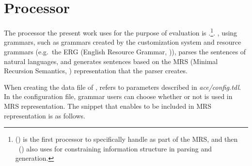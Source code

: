 \section{Processor}
\label{12:sec:processor}

The processor the present work uses for the purpose of evaluation is
\isi{\ace}.\footnote{\isi{\ace} ()
is the first  processor to specifically handle
 as part of the MRS, and then \isi{\agree}~(\citealt{slayden:12}) also uses 
    for constraining information structure in parsing and
  generation.}.
\isi{\ace}, using  grammars, such as \lingo {} grammars created by
the customization system
\citep{bender:flickinger:05,drellishak:09,bender:etal:10} and resource
grammars (e.g.\ the ERG (English Resource Grammar,
\citealt{flickinger:00})), parses the sentences of natural languages,
and generates sentences based on the MRS (Minimal Recursion Semantics,
\citealt{copestake:etal:05}) representation that the parser creates. 




When creating the data file of \isi{\ace}, \ace refers to parameters
described in \textit{ace/config.tdl}. In the configuration file,
grammar users can choose whether or not  is used in MRS
representation. The snippet that enables  to be included in MRS
representation is as follows.



